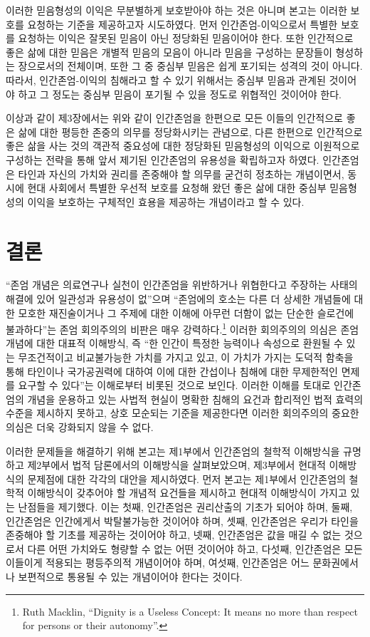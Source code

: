이러한 믿음형성의 이익은 무분별하게 보호받아야 하는 것은 아니며 본고는 이러한 보호를 요청하는 기준을 제공하고자 시도하였다. 먼저 인간존엄-이익으로서 특별한 보호를 요청하는 이익은 잘못된 믿음이 아닌 정당화된 믿음이어야 한다. 또한 인간적으로 좋은 삶에 대한 믿음은 개별적 믿음의 모음이 아니라 믿음을 구성하는 문장들이 형성하는 장으로서의 전체이며, 또한 그 중 중심부 믿음은 쉽게 포기되는 성격의 것이 아니다. 따라서, 인간존엄-이익의 침해라고 할 수 있기 위해서는 중심부 믿음과 관계된 것이어야 하고 그 정도는 중심부 믿음이 포기될 수 있을 정도로 위협적인 것이어야 한다.

이상과 같이 제3장에서는 위와 같이 인간존엄을 한편으로 모든 이들의 인간적으로 좋은 삶에 대한 평등한 존중의 의무를 정당화시키는 관념으로, 다른 한편으로 인간적으로 좋은 삶을 사는 것의 객관적 중요성에 대한 정당화된 믿음형성의 이익으로 이원적으로 구성하는 전략을 통해 앞서 제기된 인간존엄의 유용성을 확립하고자 하였다. 인간존엄은 타인과 자신의 가치와 권리를 존중해야 할 의무를 굳건히 정초하는 개념이면서, 동시에 현대 사회에서 특별한 우선적 보호를 요청해 왔던 좋은 삶에 대한 중심부 믿음형성의 이익을 보호하는 구체적인 효용을 제공하는 개념이라고 할 수 있다.

\section{결론}

``존엄 개념은 의료연구나 실천이 인간존엄을 위반하거나 위협한다고 주장하는 사태의 해결에 있어 일관성과 유용성이 없''으며 ``존엄에의 호소는 다른 더 상세한 개념들에 대한 모호한 재진술이거나 그 주제에 대한 이해에 아무런 더함이 없는 단순한 슬로건에 불과하다''는 존엄 회의주의의 비판은 매우 강력하다.\footnote{Ruth Macklin, ``Dignity is a Useless Concept: It means no more than respect for persons or their autonomy''.} 이러한 회의주의의 의심은 존엄 개념에 대한 대표적 이해방식, 즉 ``한 인간이 특정한 능력이나 속성으로 환원될 수 있는 무조건적이고 비교불가능한 가치를 가지고 있고, 이 가치가 가지는 도덕적 함축을 통해 타인이나 국가공권력에 대하여 이에 대한 간섭이나 침해에 대한 무제한적인 면제를 요구할 수 있다''는 이해로부터 비롯된 것으로 보인다. 이러한 이해를 토대로 인간존엄의 개념을 운용하고 있는 사법적 현실이 명확한 침해의 요건과 합리적인 법적 효력의 수준을 제시하지 못하고, 상호 모순되는 기준을 제공한다면 이러한 회의주의의 중요한 의심은 더욱 강화되지 않을 수 없다.

이러한 문제들을 해결하기 위해 본고는 제1부에서 인간존엄의 철학적 이해방식을 규명하고 제2부에서 법적 담론에서의 이해방식을 살펴보았으며, 제3부에서 현대적 이해방식의 문제점에 대한 각각의 대안을 제시하였다. 먼저 본고는 제1부에서 인간존엄의 철학적 이해방식이 갖추어야 할 개념적 요건들을 제시하고 현대적 이해방식이 가지고 있는 난점들을 제기했다. 이는 첫째, 인간존엄은 권리산출의 기초가 되어야 하며, 둘째, 인간존엄은 인간에게서 박탈불가능한 것이어야 하며, 셋째, 인간존엄은 우리가 타인을 존중해야 할 기초를 제공하는 것이어야 하고, 넷째, 인간존엄은 값을 매길 수 없는 것으로서 다른 어떤 가치와도 형량할 수 없는 어떤 것이어야 하고, 다섯째, 인간존엄은 모든 이들이게 적용되는 평등주의적 개념이어야 하며, 여섯째, 인간존엄은 어느 문화권에서나 보편적으로 통용될 수 있는 개념이어야 한다는 것이다.

